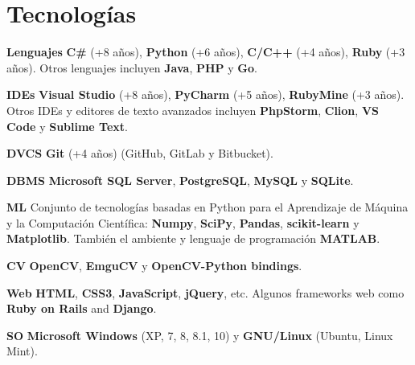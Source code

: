 \documentclass[]{friggeri-cv}
\begin{document}
\section{Tecnologías}
\begin{entrylist}
  \entry
    {\textbf{Lenguajes}}
    {}
    {}
    {\textbf{C\#} (+8 años), \textbf{Python} (+6 años), \textbf{C/C++} (+4 años), \textbf{Ruby} (+3 años). Otros lenguajes incluyen \textbf{Java}, \textbf{PHP} y \textbf{Go}. }

  \entry
    {\textbf{IDEs}}
    {}
    {}
    {\textbf{Visual Studio} (+8 años), \textbf{PyCharm} (+5 años), \textbf{RubyMine} (+3 años). Otros IDEs y editores de texto avanzados incluyen \textbf{PhpStorm}, \textbf{Clion}, \textbf{VS Code} y \textbf{Sublime Text}.}

  \entry
    {\textbf{DVCS}}
    {}
    {}
    {\textbf{Git} (+4 años) (GitHub, GitLab y Bitbucket).}
    
  \entry
    {\textbf{DBMS}}
    {}
    {}
    {\textbf{Microsoft SQL Server}, \textbf{PostgreSQL}, \textbf{MySQL} y \textbf{SQLite}.}

  \entry
    {\textbf{ML}}
    {}
    {}
    {Conjunto de tecnologías basadas en Python para el Aprendizaje de Máquina y la Computación Científica: \textbf{Numpy}, \textbf{SciPy}, \textbf{Pandas}, \textbf{scikit-learn} y \textbf{Matplotlib}. También el ambiente y lenguaje de programación \textbf{MATLAB}.}
    
  \entry
    {\textbf{CV}}
    {}
    {}
    {\textbf{OpenCV}, \textbf{EmguCV} y \textbf{OpenCV-Python bindings}.}    
    
  \entry
    {\textbf{Web}}
    {}
    {}
    {\textbf{HTML}, \textbf{CSS3}, \textbf{JavaScript}, \textbf{jQuery}, etc. Algunos frameworks web como \textbf{Ruby on Rails} and \textbf{Django}.}    
    
  \entry
    {\textbf{SO}}
    {}
    {}
    {\textbf{Microsoft Windows} (XP, 7, 8, 8.1, 10) y \textbf{GNU/Linux} (Ubuntu, Linux Mint).}
\end{entrylist}
\\
\end{document}

